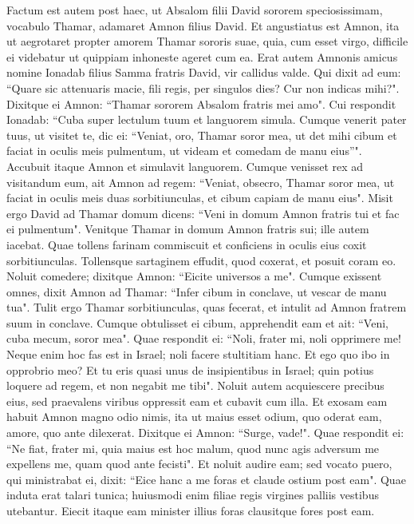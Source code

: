 \begin{biblechapter}  
\verse Factum est autem post haec, ut Absalom filii David sororem speciosissimam, vocabulo Thamar, adamaret Amnon filius David. 
\verse Et angustiatus est Amnon, ita ut aegrotaret propter amorem Thamar sororis suae, quia, cum esset virgo, difficile ei videbatur ut quippiam inhoneste ageret cum ea. 
\verse Erat autem Amnonis amicus nomine Ionadab filius Samma fratris David, vir callidus valde. 
\verse Qui dixit ad eum: “Quare sic attenuaris macie, fili regis, per singulos dies? Cur non indicas mihi?". Dixitque ei Amnon: “Thamar sororem Absalom fratris mei amo". 
\verse Cui respondit Ionadab: “Cuba super lectulum tuum et languorem simula. Cumque venerit pater tuus, ut visitet te, dic ei: “Veniat, oro, Thamar soror mea, ut det mihi cibum et faciat in oculis meis pulmentum, ut videam et comedam de manu eius”". 
\verse Accubuit itaque Amnon et simulavit languorem. Cumque venisset rex ad visitandum eum, ait Amnon ad regem: “Veniat, obsecro, Thamar soror mea, ut faciat in oculis meis duas sorbitiunculas, et cibum capiam de manu eius". 
\verse Misit ergo David ad Thamar domum dicens: “Veni in domum Amnon fratris tui et fac ei pulmentum". 
\verse Venitque Thamar in domum Amnon fratris sui; ille autem iacebat. Quae tollens farinam commiscuit et conficiens in oculis eius coxit sorbitiunculas. 
\verse Tollensque sartaginem effudit, quod coxerat, et posuit coram eo. Noluit comedere; dixitque Amnon: “Eicite universos a me". Cumque exissent omnes, 
\verse dixit Amnon ad Thamar: “Infer cibum in conclave, ut vescar de manu tua". Tulit ergo Thamar sorbitiunculas, quas fecerat, et intulit ad Amnon fratrem suum in conclave. 
\verse Cumque obtulisset ei cibum, apprehendit eam et ait: “Veni, cuba mecum, soror mea". 
\verse Quae respondit ei: “Noli, frater mi, noli opprimere me! Neque enim hoc fas est in Israel; noli facere stultitiam hanc. 
\verse Et ego quo ibo in opprobrio meo? Et tu eris quasi unus de insipientibus in Israel; quin potius loquere ad regem, et non negabit me tibi". 
\verse Noluit autem acquiescere precibus eius, sed praevalens viribus oppressit eam et cubavit cum illa. 
\verse Et exosam eam habuit Amnon magno odio nimis, ita ut maius esset odium, quo oderat eam, amore, quo ante dilexerat. Dixitque ei Amnon: “Surge, vade!". 
\verse Quae respondit ei: “Ne fiat, frater mi, quia maius est hoc malum, quod nunc agis adversum me expellens me, quam quod ante fecisti". Et noluit audire eam; 
\verse sed vocato puero, qui ministrabat ei, dixit: “Eice hanc a me foras et claude ostium post eam". 
\verse Quae induta erat talari tunica; huiusmodi enim filiae regis virgines palliis vestibus utebantur. Eiecit itaque eam minister illius foras clausitque fores post eam. 

\end{biblechapter}
